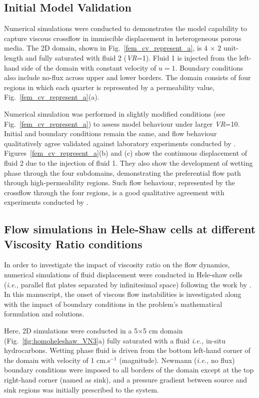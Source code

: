 \documentclass[preprint,authoryear,12pt]{elsarticle}
\newcommand{\ie}{{\it i.e., }}
\begin{document}
\subsection{Initial Model Validation}\label{section:results_validation}
Numerical simulations \citep[based on lab experiments due to][]{evans_1994,dawe_2008} were conducted to demonstrates the model capability to capture viscous crossflow in immiscible displacement in heterogeneous porous media. The 2D domain, shown in Fig.~\ref{fem_cv_represent_a}, is $4$ $\times$ $2$ unit-length and fully saturated with fluid 2 ({\it VR}=1). Fluid 1 is injected from the left-hand side of the domain with constant velocity of $u=1$. Boundary conditions also include no-flux across upper and lower borders. The domain consists of four regions in which each quarter is represented by a permeability value, Fig.~\ref{fem_cv_represent_a}(a).

\medskip
Numerical simulation was performed in slightly modified conditions (see Fig.~\ref{fem_cv_represent_a}) to assess model behaviour under larger {\it VR}=10. Initial and boundary conditions remain the same, and flow behaviour qualitatively agree validated against laboratory experiments conducted by \citet{evans_1994}. Figures~\ref{fem_cv_represent_a}(b) and (c) show the continuous displacement of fluid 2 due to the injection of fluid 1. They also show the development of wetting phase through the four subdomains, demonstrating the preferential flow path through high-permeability regions. Such flow behaviour, represented by the crossflow through the four regions, is a good qualitative agreement with experiments conducted by \citet{dawe_2008}. 

\subsection{Flow simulations in Hele-Shaw cells at different Viscosity Ratio conditions}\label{section:results_homo_hete} 
In order to investigate the impact of viscosity ratio on the flow dynamics, numerical simulations of fluid displacement were conducted in Hele-shaw cells (\ie parallel flat plates separated by infinitesimal space) following the work by \citet{saffman_1986}. In this manuscript, the onset of viscous flow instabilities \citep[following his seminal work in][]{saffman_1958} is investigated along with the impact of boundary conditions in the problem's mathematical formulation and solutions.

\medskip
Here, 2D simulations were conducted in a 5$\times$5 cm domain (Fig.~\ref{fig:homoheleshaw_VN3}a) fully saturated with a fluid \ie in-situ hydrocarbons. Wetting phase fluid is driven from the bottom left-hand corner of the domain with velocity of 1 cm.s$^{-1}$ (magnitude). Newmann (\ie no flux) boundary conditions were imposed to all borders of the domain except at the top right-hand corner (named as sink), and a pressure gradient between source and sink regions was initially prescribed to the system. 
\end{document}
